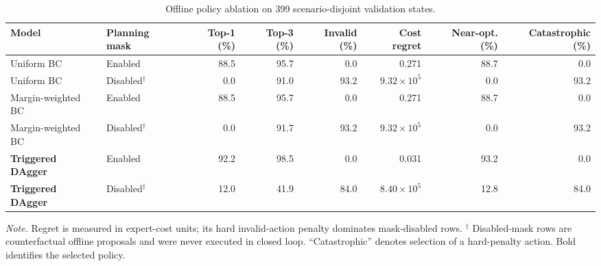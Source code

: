 \begin{table}[t]
\caption{Offline policy ablation on 399 scenario-disjoint validation states.}
\label{tab:offline-ablation}
\centering
\footnotesize
\setlength{\tabcolsep}{4.0pt}
\renewcommand{\arraystretch}{1.08}
\begin{tabular}{@{}llrrrrrr@{}}
\toprule
Model & Planning mask & Top-1 (\%) & Top-3 (\%) & Invalid (\%) & Cost regret
& Near-opt. (\%) & Catastrophic (\%) \\
\midrule
Uniform BC & Enabled & 88.5 & 95.7 & 0.0 & 0.271 & 88.7 & 0.0 \\
Uniform BC & Disabled$^{\dagger}$ & 0.0 & 91.0 & 93.2 & $9.32\times 10^{5}$ & 0.0 & 93.2 \\
\addlinespace[2pt]
Margin-weighted BC & Enabled & 88.5 & 95.7 & 0.0 & 0.271 & 88.7 & 0.0 \\
Margin-weighted BC & Disabled$^{\dagger}$ & 0.0 & 91.7 & 93.2 & $9.32\times 10^{5}$ & 0.0 & 93.2 \\
\addlinespace[2pt]
\textbf{Triggered DAgger} & Enabled & 92.2 & 98.5 & 0.0 & 0.031 & 93.2 & 0.0 \\
\textbf{Triggered DAgger} & Disabled$^{\dagger}$ & 12.0 & 41.9 & 84.0 & $8.40\times 10^{5}$ & 12.8 & 84.0 \\
\bottomrule
\end{tabular}
\vspace{2pt}

\parbox{0.98\textwidth}{\footnotesize \emph{Note.} Regret is measured in expert-cost
units; its hard invalid-action penalty dominates mask-disabled rows. $^{\dagger}$ Disabled-mask
rows are counterfactual offline proposals and were never executed in closed loop. ``Catastrophic''
denotes selection of a hard-penalty action. Bold identifies the selected policy.}
\end{table}
